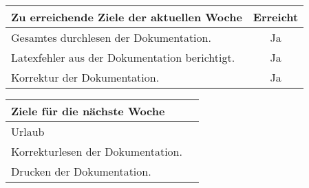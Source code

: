 \begin{tabularx}{\textwidth}{Xc}
    \arrayrulecolor{OliveGreen}
    \toprule
    {\bfseries Zu erreichende Ziele der aktuellen Woche} & {\bfseries Erreicht} \\
    \midrule[2pt]
    Gesamtes durchlesen der Dokumentation.                   &Ja              \\
    \rowcolor{OliveGreen!15}
    Latexfehler aus der Dokumentation berichtigt.            &Ja              \\
    \rowcolor{White}
    Korrektur der Dokumentation.                             &Ja              \\
    \bottomrule[2pt]
\end{tabularx}
%
\vspace{1cm}
%
\begin{tabularx}{\textwidth}{Xc}
    \arrayrulecolor{OliveGreen}
    \toprule
    {\bfseries Ziele für die nächste Woche}        &                         \\
    \midrule[2pt]
    Urlaub                     &                                             \\
    \rowcolor{OliveGreen!15}
    Korrekturlesen der Dokumentation.                      &                  \\
    \rowcolor{White}
    Drucken der Dokumentation.                      &                         \\
\end{tabularx}
